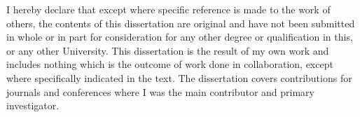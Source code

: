 
\begin{declaration}

I hereby declare that except where specific reference is made to the work of others, the contents of this dissertation are original and have not been submitted in whole or in part for consideration for any other degree or qualification in this, or any other University. This dissertation is the result of my own work and includes nothing which is the outcome of work done in collaboration, except where specifically indicated in the text. 
The dissertation covers contributions for journals and conferences where I was the main contributor and primary investigator. 


\end{declaration}

